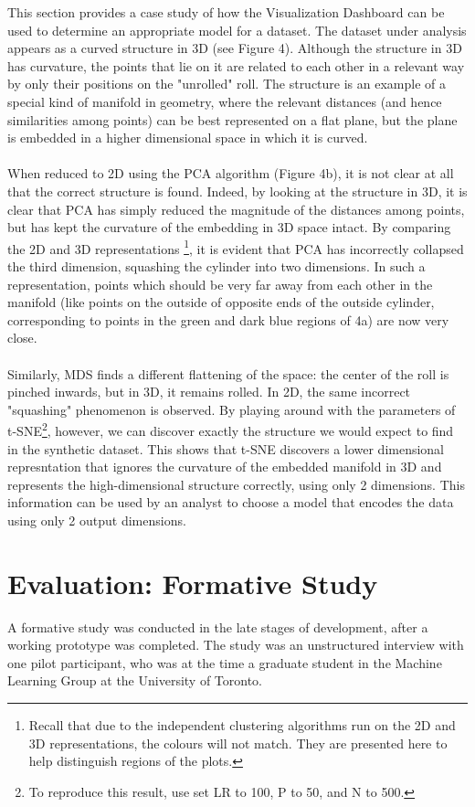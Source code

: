 \documentclass{sigchi}
\begin{document}
%
This section provides a case study of how the Visualization Dashboard can be used to determine an appropriate model for a dataset. %
%
The dataset under analysis appears as a curved structure in 3D (see Figure 4). %
%
Although the structure in 3D has curvature, the points that lie on it are related to each other in a relevant way by only their positions on the "unrolled" roll. %
%
The structure is an example of a special kind of manifold in geometry, where the relevant distances (and hence similarities among points) can be best represented on a flat plane, but the plane is embedded in a higher dimensional space in which it is curved. %
%
\\\\
%
When reduced to 2D using the PCA algorithm (Figure 4b), it is not clear at all that the correct structure is found. %
%
Indeed, by looking at the structure in 3D, it is clear that PCA has simply reduced the magnitude of the distances among points, but has kept the curvature of the embedding in 3D space intact. %
%
By comparing the 2D and 3D representations%
%
\footnote{Recall that due to the independent clustering algorithms run on the 2D and 3D representations, the colours will not match. They are presented here to help distinguish regions of the plots.}, %
%
it is evident that PCA has incorrectly collapsed the third dimension, squashing the cylinder into two dimensions. %
%
In such a representation, points which should be very far away from each other in the manifold (like points on the outside of opposite ends of the outside cylinder, corresponding to points in the green and dark blue regions of 4a) are now very close. %
%
\\\\
%
Similarly, MDS finds a different flattening of the space: the center of the roll is pinched inwards, but in 3D, it remains rolled. %
In 2D, the same incorrect "squashing" phenomenon is observed. %
%
By playing around with the parameters of t-SNE\footnote{To reproduce this result, use set LR to 100, P to 50, and N to 500.}, %
however, we can discover exactly the structure we would expect to find in the synthetic dataset. %
%
This shows that t-SNE discovers a lower dimensional represntation that ignores the curvature of the embedded manifold in 3D and represents the high-dimensional structure correctly, using only 2 dimensions. %
%
This information can be used by an analyst to choose a model that encodes the data using only 2 output dimensions.
%
\section{Evaluation: Formative Study}
A formative study was conducted in the late stages of development, after a working prototype was completed. %
%
The study was an unstructured interview with one pilot participant, who was at the time a graduate student in the Machine Learning Group at the University of Toronto. %
%
\end{document}
